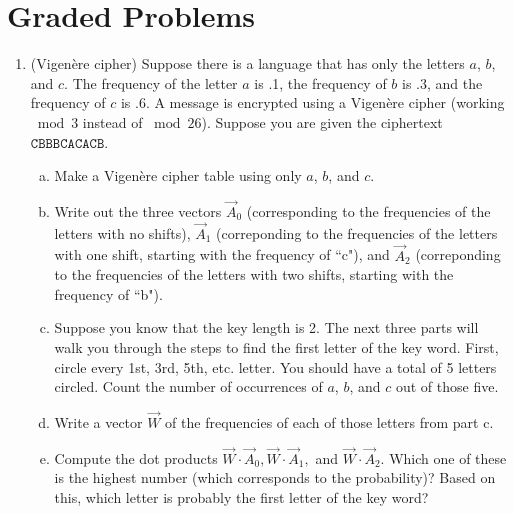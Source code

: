 \documentclass[12pt]{amsart}
\theoremstyle{plain}
\theoremstyle{definition}
\begin{document}
\section{Graded Problems}
\begin{enumerate}[1.]
\item (Vigen\`{e}re cipher) Suppose there is a language that has only the letters $a$, $b$, and $c$.  The frequency of the letter $a$ is .1, the frequency of $b$ is $.3$, and the frequency of $c$ is $.6$.  A message is encrypted using a Vigen\`{e}re cipher (working $\bmod 3$ instead of $\bmod 26$).  Suppose you are given the ciphertext $\texttt{CBBBCACACB}$.
\begin{enumerate}[a.]
	\item Make a Vigen\`{e}re cipher table using only $a$, $b$, and $c$.
		\begin{framed}
		\vspace{1.5in}
		\end{framed}
	\item Write out the three vectors $\vec{A}_0$ (corresponding to the frequencies of the letters with no shifts), $\vec{A}_1$ (correponding to the frequencies of the letters with one shift, starting with the frequency of ``c"), and $\vec{A}_2$ (correponding to the frequencies of the letters with two shifts, starting with the frequency of ``b").
		\begin{framed}
		\vspace{1.5in}
		\end{framed}
	\item Suppose you know that the key length is 2.  The next three parts will walk you through the steps to find the first letter of the key word.  First, circle every 1st, 3rd, 5th, etc. letter.  You should have a total of 5 letters circled.  Count the number of occurrences of $a$, $b$, and $c$ out of those five.
		\begin{framed}
		\vspace{.5in}
		\end{framed}
	\item Write a vector $\vec{W}$ of the frequencies of each of those letters from part c.
		\begin{framed}
		\vspace{.5in}
		\end{framed}
	\item Compute the dot products $\vec{W} \cdot \vec{A}_0, \vec{W} \cdot \vec{A}_1,$ and $\vec{W} \cdot \vec{A}_2.$  Which one of these is the highest number (which corresponds to the probability)?  Based on this, which letter is probably the first letter of the key word?

\end{enumerate}
\end{enumerate}
\end{document}
